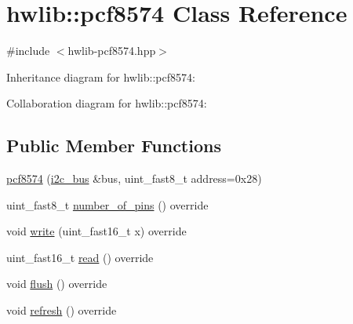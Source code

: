 \hypertarget{classhwlib_1_1pcf8574}{}\section{hwlib\+:\+:pcf8574 Class Reference}
\label{classhwlib_1_1pcf8574}


{\ttfamily \#include $<$hwlib-\/pcf8574.\+hpp$>$}



Inheritance diagram for hwlib\+:\+:pcf8574\+:


Collaboration diagram for hwlib\+:\+:pcf8574\+:
\subsection*{Public Member Functions}
\begin{DoxyCompactItemize}
\item 
\hyperlink{classhwlib_1_1pcf8574_a128f60cf8695a3528ca8fbcbb427ec88}{pcf8574} (\hyperlink{classhwlib_1_1i2c__bus}{i2c\+\_\+bus} \&bus, uint\+\_\+fast8\+\_\+t address=0x28)
\item 
uint\+\_\+fast8\+\_\+t \hyperlink{classhwlib_1_1pcf8574_abfe747fc30037f016334e2915a08f31a}{number\+\_\+of\+\_\+pins} () override
\item 
void \hyperlink{classhwlib_1_1pcf8574_a19abea394995fc9aa2fa628c263421fa}{write} (uint\+\_\+fast16\+\_\+t x) override
\item 
uint\+\_\+fast16\+\_\+t \hyperlink{classhwlib_1_1pcf8574_abf68953d24063469d4cbb867f87d3b5d}{read} () override
\item 
void \hyperlink{classhwlib_1_1pcf8574_a713a1ba3f48773641258ba1afdfc0127}{flush} () override
\item 
void \hyperlink{classhwlib_1_1pcf8574_a6a82756c72f3f2599914cec45c8ed900}{refresh} () override
\end{DoxyCompactItemize}
